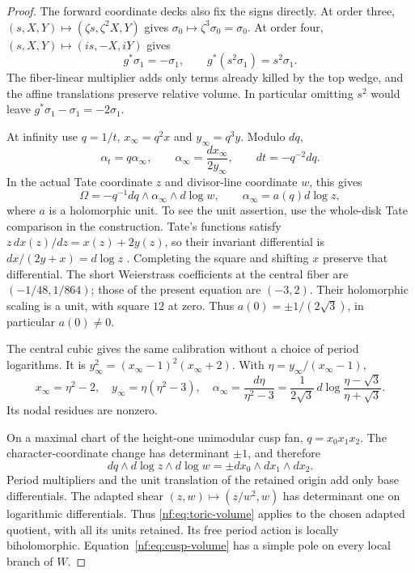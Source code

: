 \begin{proof}
The forward coordinate decks also fix the signs directly. At order
three, $(s,X,Y)\mapsto(\zeta s,\zeta^2X,Y)$ gives
$\sigma_0\mapsto\zeta^3\sigma_0=\sigma_0$. At order four,
$(s,X,Y)\mapsto(is,-X,iY)$ gives
\begin{equation}\label{nf:eq:volume-character}
 g^*\sigma_1=-\sigma_1,\qquad
 g^*(s^2\sigma_1)=s^2\sigma_1.
\end{equation}
The fiber-linear multiplier adds only terms already killed by the
top wedge, and the affine translations preserve relative volume.
In particular omitting $s^2$ would leave
$g^*\sigma_1-\sigma_1=-2\sigma_1$.

At infinity use $q=1/t$, $x_\infty=q^2x$ and $y_\infty=q^3y$.
Modulo $dq$,
\[
 \alpha_t=q\alpha_\infty,\qquad
 \alpha_\infty=\frac{dx_\infty}{2y_\infty},\qquad
 dt=-q^{-2}dq.
\]
In the actual Tate coordinate $z$ and divisor-line coordinate $w$,
this gives
\begin{equation}\label{nf:eq:cusp-volume}
 \Omega=-q^{-1}dq\wedge\alpha_\infty\wedge d\log w,\qquad
 \alpha_\infty=a(q)d\log z,
\end{equation}
where $a$ is a holomorphic unit. To see the unit assertion, use the
whole-disk Tate comparison in the construction. Tate's functions
satisfy $z\,dx(z)/dz=x(z)+2y(z)$, so their invariant differential is
$dx/(2y+x)=d\log z$ \cite{TateElliptic}. Completing the square and
shifting $x$ preserve that differential. The short Weierstrass
coefficients at the central fiber are $(-1/48,1/864)$; those of the
present equation are $(-3,2)$. Their holomorphic scaling is a unit,
with square $12$ at zero. Thus
$a(0)=\pm1/(2\sqrt3)$, in particular $a(0)\ne0$.

The central cubic gives the same calibration without a choice of
period logarithms. It is
$y_\infty^2=(x_\infty-1)^2(x_\infty+2)$. With
$\eta=y_\infty/(x_\infty-1)$,
\begin{equation}\label{nf:eq:nodal-differential}
 x_\infty=\eta^2-2,\quad
 y_\infty=\eta(\eta^2-3),\quad
 \alpha_\infty=\frac{d\eta}{\eta^2-3}
 =\frac1{2\sqrt3}\,
 d\log\frac{\eta-\sqrt3}{\eta+\sqrt3}.
\end{equation}
Its nodal residues are nonzero.

On a maximal chart of the height-one unimodular cusp fan,
$q=x_0x_1x_2$. The character-coordinate change has determinant
$\pm1$, and therefore
\begin{equation}\label{nf:eq:toric-volume}
 dq\wedge d\log z\wedge d\log w
       =\pm dx_0\wedge dx_1\wedge dx_2.
\end{equation}
Period multipliers and the unit translation of the retained origin
add only base differentials. The adapted shear
$(z,w)\mapsto(z/w^2,w)$ has determinant one on logarithmic
differentials. Thus \eqref{nf:eq:toric-volume} applies to the chosen
adapted quotient, with all its units retained. Its free period
action is locally biholomorphic. Equation~\eqref{nf:eq:cusp-volume}
has a simple pole on every local branch of $W$.


\end{proof}
